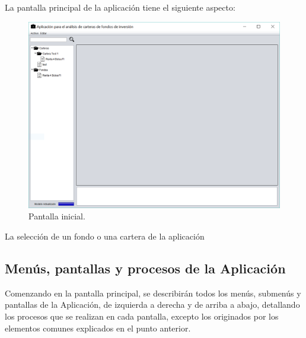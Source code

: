\documentclass[12pt, a4paper]{book}
\begin{document}
La pantalla principal de la aplicación tiene el siguiente aspecto:

\begin{figure}[htbp]
	\centering
	\includegraphics[width=\textwidth]{figuras/guifinal.PNG}
	\caption{Pantalla inicial.}
	\label{fig:guifinal}
	\end {figure}
	
	La selección de un fondo o una cartera de la aplicación 

\subsection{Menús, pantallas y procesos de la Aplicación}

Comenzando en la pantalla principal, se describirán todos los
menús, submenús y pantallas de la Aplicación, de izquierda a
derecha y de arriba a abajo, detallando los procesos que se
realizan en cada pantalla, excepto los originados por los
elementos comunes explicados en el punto anterior.


\cleardoublepage

\newpage
\end{document}
